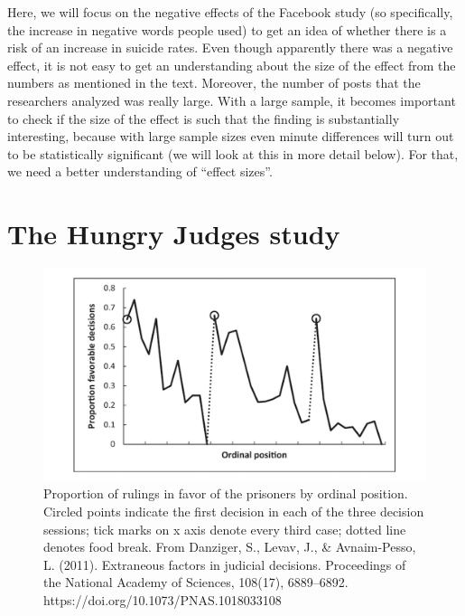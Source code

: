 \documentclass[
]{krantz}
\begin{document}
Here, we will focus on the negative effects of the Facebook study (so specifically, the increase in negative words people used) to get an idea of whether there is a risk of an increase in suicide rates. Even though apparently there was a negative effect, it is not easy to get an understanding about the size of the effect from the numbers as mentioned in the text. Moreover, the number of posts that the researchers analyzed was really large. With a large sample, it becomes important to check if the size of the effect is such that the finding is substantially interesting, because with large sample sizes even
minute differences will turn out to be statistically significant (we will look at this in more detail below). For that, we need a better understanding of ``effect sizes''.

\hypertarget{the-hungry-judges-study}{%
\section{The Hungry Judges study}\label{the-hungry-judges-study}}

\begin{figure}

{\centering \includegraphics[width=1\linewidth]{images/hungryjudges} 

}

\caption{Proportion of rulings in favor of the prisoners by ordinal position. Circled points indicate the first decision in each of the three decision sessions; tick marks on x axis denote every third case; dotted line denotes food break. From Danziger, S., Levav, J., & Avnaim-Pesso, L. (2011). Extraneous factors in judicial decisions. Proceedings of the National Academy of Sciences, 108(17), 6889–6892. https://doi.org/10.1073/PNAS.1018033108}\label{fig:hungryjudges}
\end{figure}
\end{document}
